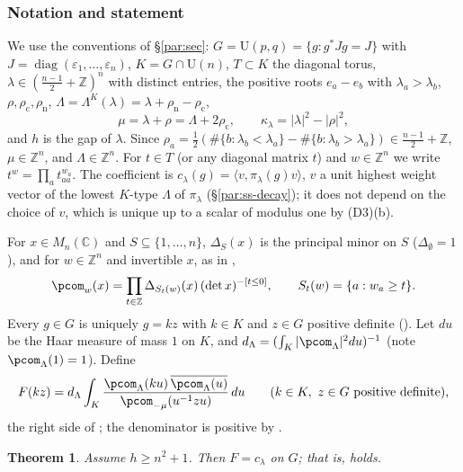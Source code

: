 \documentclass[10pt]{amsart}
\newtheorem{theorem}{Theorem}[section]
\theoremstyle{definition}
\theoremstyle{remark}
\newcommand{\C}{\mathbb C}
\newcommand{\Z}{\mathbb Z}
\providecommand{\auU}{\mathrm U}
\begin{document}
\subsubsection{Notation and statement}\label{pco:ss-stat}
We use the conventions of \S\ref{par:sec}: $G=\auU(p,q)=\{g:g^*Jg=J\}$ with
$J=\operatorname{diag}(\varepsilon_1,\dots,\varepsilon_n)$, $K=G\cap\auU(n)$, $T\subset K$ the
diagonal torus, $\lambda\in(\frac{n-1}2+\Z)^n$ with distinct entries, the positive roots
$e_a-e_b$ with $\lambda_a>\lambda_b$, $\rho,\rho_{\mathrm c},\rho_{\mathrm n}$,
$\Lambda=\Lambda^K(\lambda)=\lambda+\rho_{\mathrm n}-\rho_{\mathrm c}$,
\[
\mu=\lambda+\rho=\Lambda+2\rho_{\mathrm c},\qquad\kappa_\lambda=|\lambda|^2-|\rho|^2,
\]
and $h$ is the gap of $\lambda$. Since $\rho_a=\frac12(\#\{b:\lambda_b<\lambda_a\}-\#\{b:\lambda_b>
\lambda_a\})\in\frac{n-1}2+\Z$, $\mu\in\Z^n$, and $\Lambda\in\Z^n$. For $t\in T$ (or any
diagonal matrix $t$) and $w\in\Z^n$ we write $t^w=\prod_at_{aa}^{w_a}$. The coefficient is
$c_\lambda(g)=\langle v,\pi_\lambda(g)v\rangle$, $v$ a unit highest weight vector of the lowest
$K$-type $\Lambda$ of $\pi_\lambda$ (\S\ref{par:ss-decay}); it does not depend on the choice of
$v$, which is unique up to a scalar of modulus one by (D3)(b).

For $x\in M_n(\C)$ and $S\subseteq\{1,\dots,n\}$, $\Delta_S(x)$ is the principal minor on $S$
($\Delta_\emptyset=1$), and for $w\in\Z^n$ and invertible $x$, as in {\cite[(57)]{P51}},
\[
\pcom_w(x)=\prod_{t\in\Z}\Delta_{S_t(w)}(x)\,(\det x)^{-[t\le0]},\qquad S_t(w)=\{a:w_a\ge t\}.
\]
Every $g\in G$ is uniquely $g=kz$ with $k\in K$ and $z\in G$ positive definite
({\cite[\S5.2]{P51}}). Let $du$ be the Haar measure of mass $1$ on $K$, and
$d_\Lambda=(\int_K|\pcom_\Lambda|^2du)^{-1}$ (note $\pcom_\Lambda(1)=1$). Define
\begin{equation}\label{pco:eq-F}
F(kz)=d_\Lambda\int_K\frac{\pcom_\Lambda(ku)\,\overline{\pcom_\Lambda(u)}}{\pcom_{-\mu}(u^{-1}zu)}\,du
\qquad(k\in K,\ z\in G\text{ positive definite}),
\end{equation}
the right side of {\cite[(59)]{P51}}; the denominator is positive by {\cite[Lemma~5.5]{P51}}.

\begin{theorem}\label{pco:FJ}
Assume $h\ge n^2+1$. Then $F=c_\lambda$ on $G$; that is, {\cite[(59)]{P51}} holds.
\end{theorem}
\end{document}
